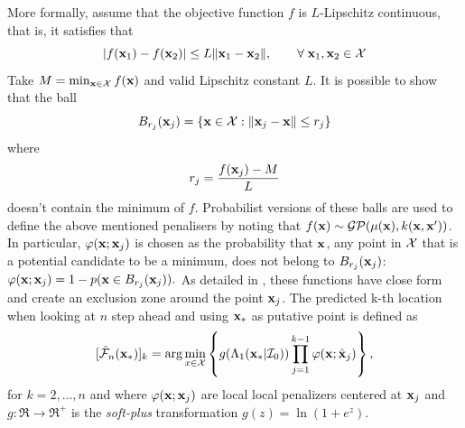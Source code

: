 \documentclass[twoside]{article}
\newcommand{\I}{\mathcal{I}}
\newcommand{\GP}{\mathcal{GP}}
\newcommand{\future}{\mathcal{F}}
\begin{document}
More formally, assume that the objective function $f$ is $L$-Lipschitz continuous, that is, it satisfies that
\begin{equation}\label{eq:lipschitz}
|f(\mathbf{x}_1) - f(\mathbf{x}_2) | \leq L \|\mathbf{x}_1 -\mathbf{x}_2 \|,\qquad\forall\; \mathbf{x}_1,\mathbf{x}_2\in\mathcal{X}
\end{equation} 
Take $M = \min_{\mathbf{x} \in {\mathcal{X}}} f(\mathbf{x})$ and valid Lipschitz constant $L$. It is possible to show that  the ball
\begin{equation}\label{eq:radious}
B_{r_j}(\mathbf{x}_j)= \{\mathbf{x}\in \mathcal{X} : \|\mathbf{x}_j-\mathbf{x} \| \leq r_j \}
\end{equation}
where
$$r_j = \frac{f(\mathbf{x}_j)-M}{L}$$
doesn't contain the minimum of $f$. Probabilist versions of these balls are used to define the above mentioned penalisers by noting that $\latentForce(\latentVector) \sim \GP(\mu(\latentVector),k(\latentVector,\latentVector'))$. In particular, $\varphi(\mathbf{x};\mathbf{x}_j)$ is chosen as the probability that $\mathbf{x}$, any point in $\mathcal{X}$ that is a potential candidate to be a minimum, does not belong to $B_{r_j}(\mathbf{x}_j)$: $\varphi(\mathbf{x};\mathbf{x}_j)  = 1- p (\mathbf{x}  \in B_{r_j}(\mathbf{x}_j)).$
As detailed in \cite{gonzalez2015batch}, these functions have close form and create an exclusion zone around the point $\mathbf{x}_j$. The predicted k-th location when looking at $n$ step ahead and using $\mathbf{x}_*$ as putative point is defined as
\begin{equation}\label{eq:penalized_acquisition}
 [\hat{\future}_n(\latentVector_*)]_k  =\arg \min_{x \in \inputSpace} \left\{g(\Lambda_1(\latentVector_*| \I_0))\prod_{j=1}^{k-1}\varphi(\latentVector;\hat{\latentVector}_{j})\right\},
\end{equation}
for $k=2,\dots,n$ and where $\varphi(\mathbf{x};\mathbf{x}_{j})$ are local local penalizers centered at $\mathbf{x}_{j}$ and $g:\Re \rightarrow \Re^+$ is the \emph{soft-plus} transformation $g(z)= \ln(1+e^z)$.
\end{document}
